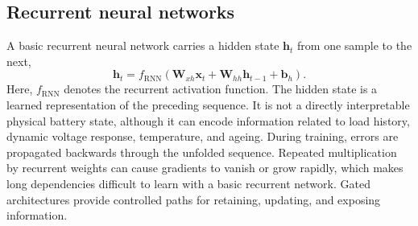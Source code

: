 \documentclass[
    a4paper,
    12pt,
    titlepage,
    bibliography=totoc,
    twoside=on,
    parskip=false,
    numbers=noenddot,
    cleardoublepage=empty,
    DIV=12,
    BCOR=12.0mm,
    headheight=36pt,
    headings=openright
]{scrreprt}
\begin{document}
\subsection{Recurrent neural networks}
\label{sec:fundamental_rnn}
A basic recurrent neural network carries a hidden state $\mathbf{h}_t$ from one sample to the next,
\begin{equation}
    \mathbf{h}_t
    =
    f_{\mathrm{RNN}}\!\left(
    \mathbf{W}_{xh}\mathbf{x}_t
    +\mathbf{W}_{hh}\mathbf{h}_{t-1}
    +\mathbf{b}_h
    \right).
    \label{eq:fundamental_rnn}
\end{equation}
Here, $f_{\mathrm{RNN}}$ denotes the recurrent activation function. The hidden state is a learned representation of the preceding sequence. It is not a directly interpretable physical battery state, although it can encode information related to load history, dynamic voltage response, temperature, and ageing. During training, errors are propagated backwards through the unfolded sequence. Repeated multiplication by recurrent weights can cause gradients to vanish or grow rapidly, which makes long dependencies difficult to learn with a basic recurrent network. Gated architectures provide controlled paths for retaining, updating, and exposing information.\autocite{liptonCriticalReviewRecurrent2015,pascanuDifficultyTrainingRecurrent2012}
\end{document}
